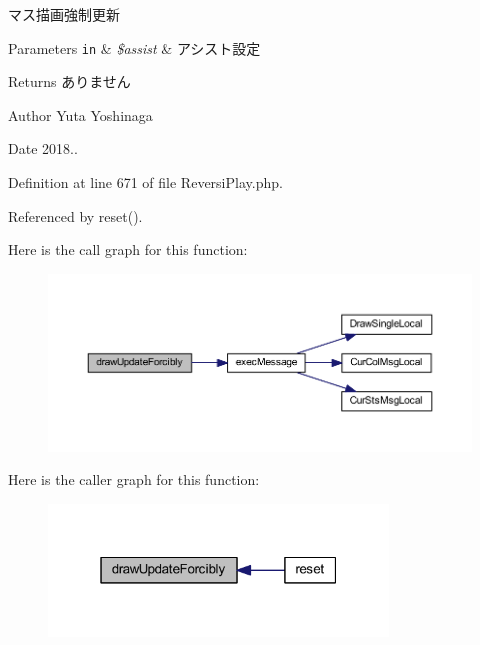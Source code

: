 マス描画強制更新 


\begin{DoxyParams}[1]{Parameters}
\mbox{\tt in}  & {\em \$assist} & アシスト設定 \\
\hline
\end{DoxyParams}
\begin{DoxyReturn}{Returns}
ありません 
\end{DoxyReturn}
\begin{DoxyAuthor}{Author}
Yuta Yoshinaga 
\end{DoxyAuthor}
\begin{DoxyDate}{Date}
2018.. 
\end{DoxyDate}


Definition at line 671 of file Reversi\+Play.\+php.



Referenced by reset().

Here is the call graph for this function\+:\nopagebreak
\begin{figure}[H]
\begin{center}
\leavevmode
\includegraphics[width=350pt]{class_reversi_play_a3ae28eb121caf59932218ea7d1fca81d_cgraph}
\end{center}
\end{figure}
Here is the caller graph for this function\+:\nopagebreak
\begin{figure}[H]
\begin{center}
\leavevmode
\includegraphics[width=256pt]{class_reversi_play_a3ae28eb121caf59932218ea7d1fca81d_icgraph}
\end{center}
\end{figure}
\mbox{\label{class_reversi_play_ae8beea2648c1c5cf722364e84a90edf9}} 
